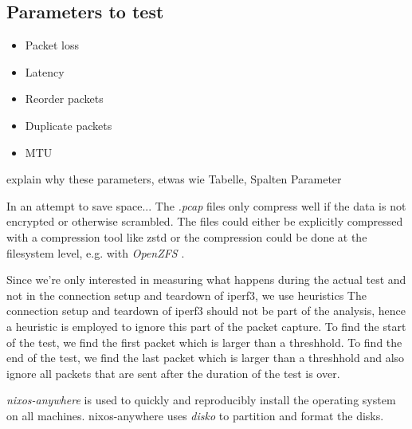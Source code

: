 \subsection{Parameters to test}
\begin{itemize}
  \item Packet loss
  \item Latency
  \item Reorder packets
  \item Duplicate packets
  \item MTU
\end{itemize}
explain why these parameters, etwas wie Tabelle, Spalten Parameter







In an attempt to save space...
The \textit{.pcap} \cite{wiki:Pcap} files only compress well if the data is not encrypted or otherwise scrambled.
The files could either be explicitly compressed with a compression tool like zstd or the compression could be done at the filesystem level, e.g. with \textit{OpenZFS} \cite{OpenZFS}.


Since we're only interested in measuring what happens during the actual test and not in the connection setup and teardown of iperf3, we use heuristics
The connection setup and teardown of iperf3 should not be part of the analysis, hence a heuristic is employed to ignore this part of the packet capture. To find the start of the test, we find the first packet which is larger than a threshhold. To find the end of the test, we find the last packet which is larger than a threshhold and also ignore all packets that are sent after the duration of the test is over.


\textit{nixos-anywhere} \cite{nixos-anywhere} is used to quickly and reproducibly install the operating system on all machines.
nixos-anywhere uses \textit{disko} \cite{disko} to partition and format the disks.



